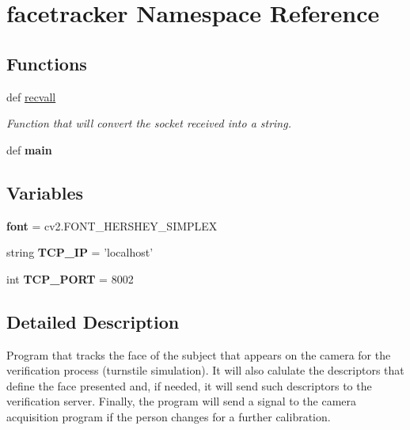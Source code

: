 \hypertarget{namespacefacetracker}{\section{facetracker Namespace Reference}
\label{namespacefacetracker}
}
\subsection*{Functions}
\begin{DoxyCompactItemize}
\item 
def \hyperlink{namespacefacetracker_afd03f1d703bca2c3f01ceac6ca711f17}{recvall}
\begin{DoxyCompactList}\small\item\em Function that will convert the socket received into a string. \end{DoxyCompactList}\item 
\hypertarget{namespacefacetracker_a8c68f7ebd8f2b1e99b6d3336430ad2be}{def {\bfseries main}}\label{namespacefacetracker_a8c68f7ebd8f2b1e99b6d3336430ad2be}

\end{DoxyCompactItemize}
\subsection*{Variables}
\begin{DoxyCompactItemize}
\item 
\hypertarget{namespacefacetracker_af8f8c0f83a1bcab62b58ffe151d54257}{{\bfseries font} = cv2.\-F\-O\-N\-T\-\_\-\-H\-E\-R\-S\-H\-E\-Y\-\_\-\-S\-I\-M\-P\-L\-E\-X}\label{namespacefacetracker_af8f8c0f83a1bcab62b58ffe151d54257}

\item 
\hypertarget{namespacefacetracker_a0d3f577882e0f8deade5722e75594b58}{string {\bfseries T\-C\-P\-\_\-\-I\-P} = 'localhost'}\label{namespacefacetracker_a0d3f577882e0f8deade5722e75594b58}

\item 
\hypertarget{namespacefacetracker_a7fd84c2f2afecb14acb6526007adb04a}{int {\bfseries T\-C\-P\-\_\-\-P\-O\-R\-T} = 8002}\label{namespacefacetracker_a7fd84c2f2afecb14acb6526007adb04a}

\end{DoxyCompactItemize}


\subsection{Detailed Description}
\begin{DoxyVerb}Program that tracks the face of the subject that appears on the camera for the verification process (turnstile simulation). 
It will also calulate the descriptors that define the face presented and, if needed, it will send such descriptors to the verification server.
Finally, the program will send a signal to the camera acquisition program if the person changes for a further calibration. 
\end{DoxyVerb}
 

